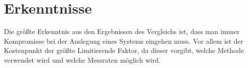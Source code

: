 \section{Erkenntnisse}
Die größte Erkenntnis aus den Ergebnissen des Vergleichs ist, dass man immer Kompromisse bei der Auslegung eines Systems eingehen muss. Vor allem ist der Kostenpunkt der größte Limitierende Faktor, da dieser vorgibt, welche Methode verwendet wird und welche Messraten möglich wird. 

